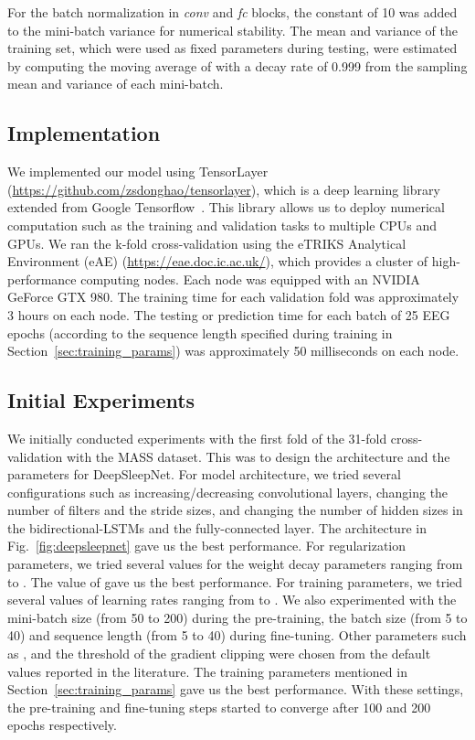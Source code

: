 \documentclass[journal,twoside]{IEEEtran}
\begin{document}
For the batch normalization in \textit{conv} and \textit{fc} blocks, the  constant of 10 was added to the mini-batch variance for numerical stability. The mean and variance of the training set, which were used as fixed parameters during testing, were estimated by computing the moving average of with a decay rate of 0.999 from the sampling mean and variance of each mini-batch.

\subsection{Implementation} \label{sec:implementation}
We implemented our model using TensorLayer (\url{https://github.com/zsdonghao/tensorlayer}), which is a deep learning library extended from Google Tensorflow~\cite{abadi2015}. This library allows us to deploy numerical computation such as the training and validation tasks to multiple CPUs and GPUs. We ran the k-fold cross-validation using the eTRIKS Analytical Environment (eAE) (\url{https://eae.doc.ic.ac.uk/}), which provides a cluster of high-performance computing nodes. Each node was equipped with an NVIDIA GeForce GTX 980. The training time for each validation fold was approximately 3 hours on each node. The testing or prediction time for each batch of 25 EEG epochs (according to the sequence length specified during training in Section~\ref{sec:training_params}) was approximately 50 milliseconds on each node.


\subsection{Initial Experiments} \label{sec:init_exp}
We initially conducted experiments with the first fold of the 31-fold cross-validation with the MASS dataset. This was to design the architecture and the parameters for DeepSleepNet.
For model architecture, we tried several configurations such as increasing/decreasing convolutional layers, changing the number of filters and the stride sizes, and changing the number of hidden sizes in the bidirectional-LSTMs and the fully-connected layer. The architecture in Fig.~\ref{fig:deepsleepnet} gave us the best performance.
For regularization parameters, we tried several values for the weight decay parameters ranging from  to . The value of  gave us the best performance.
For training parameters, we tried several values of learning rates ranging from  to . We also experimented with the mini-batch size (from 50 to 200) during the pre-training, the batch size (from 5 to 40) and sequence length (from 5 to 40) during fine-tuning. Other parameters such as ,  and the threshold of the gradient clipping were chosen from the default values reported in the literature. The training parameters mentioned in Section~\ref{sec:training_params} gave us the best performance. With these settings, the pre-training and fine-tuning steps started to converge after 100 and 200 epochs respectively.
\end{document}
